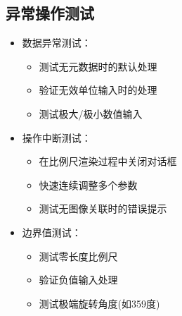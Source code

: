 \documentclass[a4paper,12pt]{report}	%
\begin{document}
\subsection{异常操作测试}
\begin{itemize}
    \item 数据异常测试：
    \begin{itemize}
        \item 测试无元数据时的默认处理
        \item 验证无效单位输入时的处理
        \item 测试极大/极小数值输入
    \end{itemize}
    
    \item 操作中断测试：
    \begin{itemize}
        \item 在比例尺渲染过程中关闭对话框
        \item 快速连续调整多个参数
        \item 测试无图像关联时的错误提示
    \end{itemize}
    
    \item 边界值测试：
    \begin{itemize}
        \item 测试零长度比例尺
        \item 验证负值输入处理
        \item 测试极端旋转角度(如359度)
    \end{itemize}
\end{itemize}
\end{document}
